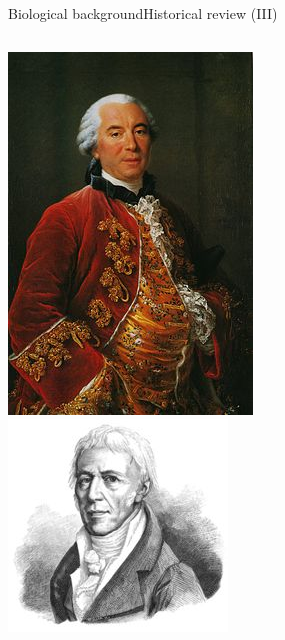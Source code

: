 \documentclass[10pt,compress]{beamer} %
\begin{document}
\begin{frame}{Biological background}{Historical review (III)}
\begin{columns}
		\centering\includegraphics[width=\linewidth]{figs/leclerc.jpg}\\
		\centering\includegraphics[width=\linewidth]{figs/lamarck.jpg}
	\end{columns}
\end{frame}
\end{document}
